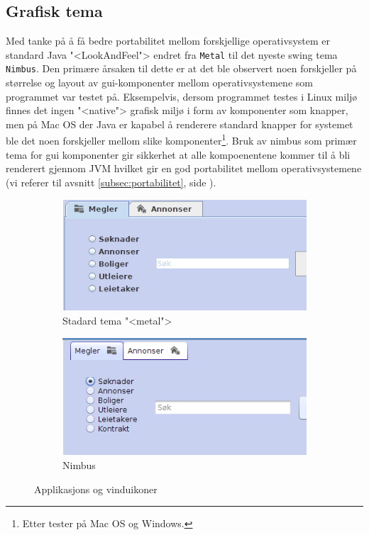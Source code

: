 \subsection{Grafisk tema}
Med tanke på å få bedre portabilitet mellom forskjellige operativsystem er standard Java "<LookAndFeel"> endret fra \texttt{Metal} til det nyeste swing tema \texttt{Nimbus}. Den primære årsaken til dette er at det ble observert noen forskjeller på størrelse og layout av gui-komponenter mellom operativsystemene som programmet var testet på. Eksempelvis, dersom programmet testes i Linux miljø finnes det ingen "<native"> grafisk miljø i form av komponenter som knapper, men på Mac OS der Java er kapabel å renderere standard knapper for systemet ble det noen forskjeller mellom slike komponenter\footnote{Etter tester på Mac OS og Windows.}. Bruk av nimbus som primær tema for gui komponenter gir sikkerhet at alle kompoenentene kommer til å bli renderert gjennom JVM hvilket gir en god portabilitet mellom operativsystemene (vi referer til avsnitt \ref{subsec:portabilitet}, side \pageref{subsec:portabilitet}).

\begin{figure}[ht!]
\centering
\begin{subfigure}[b]{\textwidth}
\centering
\includegraphics[scale=0.6]{./img/produktdokumentasjon/visuelle_detaljer/metal.png}
\caption{Stadard tema "<metal">}
\end{subfigure}



\begin{subfigure}[b]{\textwidth}
\centering
\includegraphics[scale=0.6]{./img/produktdokumentasjon/visuelle_detaljer/nimbus.png}
\caption{Nimbus}
\end{subfigure}
\caption{Applikasjons og vinduikoner}\label{fig:tema}
\end{figure}